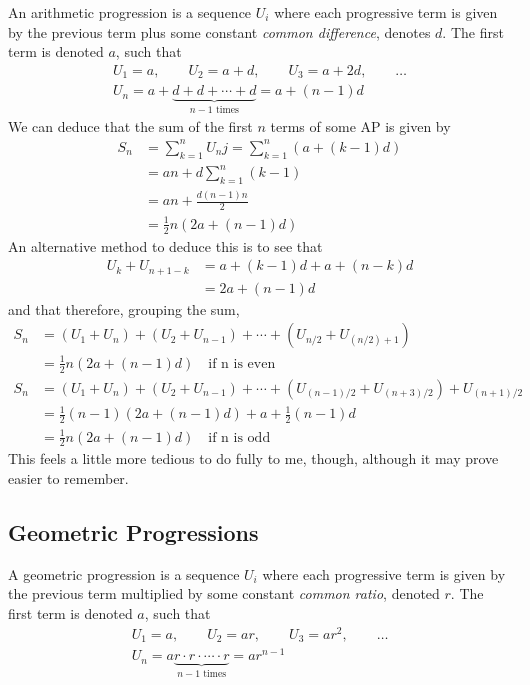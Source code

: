 An arithmetic progression is a sequence \(U_i\) where each progressive term is
given by the previous term plus some constant \emph{common difference}, denotes
\(d\). The first term is denoted \(a\), such that
\begin{gather*}
 U_1 = a, \qquad U_2 = a + d, \qquad U_3 = a + 2d, \qquad \dots\\
 U_n = a + \underbrace{d  + d  + \dotsb + d}_{\text{\(n - 1\) times}}
     = a + (n - 1)d
\end{gather*}
We can deduce that the sum of the first \(n\) terms of some AP is given by
\begin{align*}
 S_n &= \sum_{k = 1}^n U_nj = \sum_{k = 1}^n (a + (k - 1)d) \\
     &= an + d\sum_{k = 1}^n (k - 1) \\
     &= an + \frac{d(n - 1)n} 2 \\
     &= \tfrac 12 n (2a + (n - 1)d)
\end{align*}
An alternative method to deduce this is to see that
\begin{align*}
 U_k + U_{n + 1 - k} &= a + (k - 1)d + a + (n - k)d \\
     &= 2a + (n - 1)d
\end{align*}
and that therefore, grouping the sum,
\begin{align*}
 S_n &= (U_1 + U_n) + (U_2 + U_{n - 1}) + \dotsb
      + (U_{n / 2} + U_{(n / 2) + 1}) \\
     &= \tfrac 12 n(2a + (n - 1)d) \quad \text{if n is even} \\
 S_n &= (U_1 + U_n) + (U_2 + U_{n - 1}) + \dotsb
      + (U_{(n - 1) / 2} + U_{(n + 3) / 2}) + U_{(n + 1) / 2} \\
     &= \tfrac 12 (n - 1)(2a + (n - 1)d) + a + \tfrac 12 (n - 1) d \\
     &= \tfrac 12 n(2a + (n - 1)d) \quad \text{if n is odd}
\end{align*}
This feels a little more tedious to do fully to me, though, although it may
prove easier to remember.


\subsection{Geometric Progressions} \label{sec_seq_GP}

A geometric progression is a sequence \(U_i\) where each progressive term is
given by the previous term multiplied by some constant \emph{common ratio},
denoted \(r\). The first term is denoted \(a\), such that
\begin{gather*}
 U_1 = a, \qquad U_2 = ar, \qquad U_3 = ar^2, \qquad \dots\\
 U_n = a\underbrace{r \cdot r \cdot \dotsb \cdot r}_{\text{\(n - 1\) times}}
     = ar^{n - 1}
\end{gather*}

